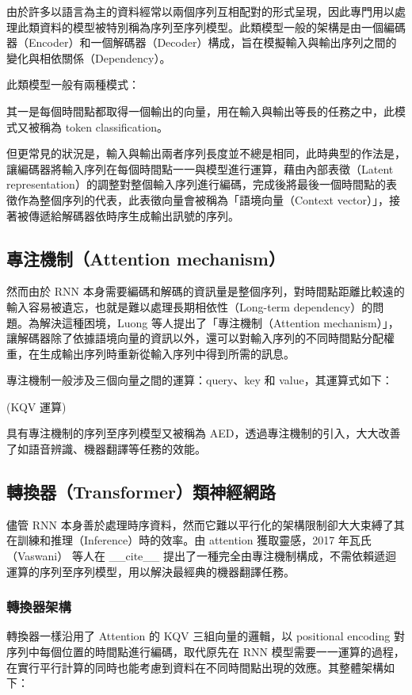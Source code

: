 由於許多以語言為主的資料經常以兩個序列互相配對的形式呈現，因此專門用以處理此類資料的模型被特別稱為序列至序列模型。此類模型一般的架構是由一個編碼器（Encoder）和一個解碼器（Decoder）構成，旨在模擬輸入與輸出序列之間的變化與相依關係（Dependency）。

此類模型一般有兩種模式：

其一是每個時間點都取得一個輸出的向量，用在輸入與輸出等長的任務之中，此模式又被稱為 token classification。

但更常見的狀況是，輸入與輸出兩者序列長度並不總是相同，此時典型的作法是，讓編碼器將輸入序列在每個時間點一一與模型進行運算，藉由內部表徵（Latent representation）的調整對整個輸入序列進行編碼，完成後將最後一個時間點的表徵作為整個序列的代表，此表徵向量會被稱為「語境向量（Context vector）」，接著被傳遞給解碼器依時序生成輸出訊號的序列。

\subsection{專注機制（Attention mechanism）}

然而由於 RNN 本身需要編碼和解碼的資訊量是整個序列，對時間點距離比較遠的輸入容易被遺忘，也就是難以處理長期相依性（Long-term dependency）的問題。為解決這種困境，Luong 等人提出了「專注機制（Attention mechanism）」，讓解碼器除了依據語境向量的資訊以外，還可以對輸入序列的不同時間點分配權重，在生成輸出序列時重新從輸入序列中得到所需的訊息。

專注機制一般涉及三個向量之間的運算：query、key 和 value，其運算式如下：

(KQV 運算)

具有專注機制的序列至序列模型又被稱為 AED，透過專注機制的引入，大大改善了如語音辨識、機器翻譯等任務的效能。

\subsection{轉換器（Transformer）類神經網路}

儘管 RNN 本身善於處理時序資料，然而它難以平行化的架構限制卻大大束縛了其在訓練和推理（Inference）時的效率。由 attention 獲取靈感，2017 年瓦氏（Vaswani） 等人在 \_\_cite\_\_ 提出了一種完全由專注機制構成，不需依賴遞迴運算的序列至序列模型，用以解決最經典的機器翻譯任務。

\subsubsection{轉換器架構}

轉換器一樣沿用了 Attention 的 KQV 三組向量的邏輯，以 positional encoding 對序列中每個位置的時間點進行編碼，取代原先在 RNN 模型需要一一運算的過程，在實行平行計算的同時也能考慮到資料在不同時間點出現的效應。其整體架構如下：

